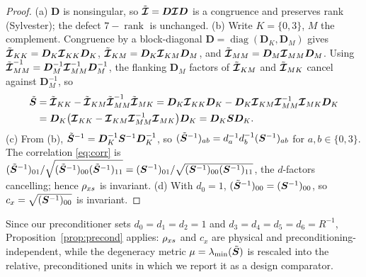 \begin{proof}
(a) $\bm{D}$ is nonsingular, so $\tilde{\bm{\mathcal{I}}}=\bm{D}\bm{\mathcal{I}}\bm{D}$ is a congruence
and preserves rank (Sylvester); the defect $7-\operatorname{rank}$ is unchanged.
(b) Write $K=\{0,3\}$, $M$ the complement. Congruence by a block-diagonal
$\bm{D}=\operatorname{diag}(\bm{D}_K,\bm{D}_M)$ gives
$\tilde{\bm{\mathcal{I}}}_{KK}=\bm{D}_K\bm{\mathcal{I}}_{KK}\bm{D}_K$,
$\tilde{\bm{\mathcal{I}}}_{KM}=\bm{D}_K\bm{\mathcal{I}}_{KM}\bm{D}_M$, and
$\tilde{\bm{\mathcal{I}}}_{MM}=\bm{D}_M\bm{\mathcal{I}}_{MM}\bm{D}_M$. Using
$\tilde{\bm{\mathcal{I}}}_{MM}^{-1}=\bm{D}_M^{-1}\bm{\mathcal{I}}_{MM}^{-1}\bm{D}_M^{-1}$, the flanking
$\bm{D}_M$ factors of $\tilde{\bm{\mathcal{I}}}_{KM}$ and $\tilde{\bm{\mathcal{I}}}_{MK}$ cancel against
$\bm{D}_M^{-1}$, so
\begin{align*}
  \tilde{\bm{S}}
  &= \tilde{\bm{\mathcal{I}}}_{KK}-\tilde{\bm{\mathcal{I}}}_{KM}\tilde{\bm{\mathcal{I}}}_{MM}^{-1}\tilde{\bm{\mathcal{I}}}_{MK}
   = \bm{D}_K\bm{\mathcal{I}}_{KK}\bm{D}_K
     - \bm{D}_K\bm{\mathcal{I}}_{KM}\bm{\mathcal{I}}_{MM}^{-1}\bm{\mathcal{I}}_{MK}\bm{D}_K\\
  &= \bm{D}_K\bigl(\bm{\mathcal{I}}_{KK}-\bm{\mathcal{I}}_{KM}\bm{\mathcal{I}}_{MM}^{-1}\bm{\mathcal{I}}_{MK}\bigr)\bm{D}_K
   = \bm{D}_K\bm{S}\bm{D}_K .
\end{align*}
(c) From (b),
$\tilde{\bm{S}}^{-1}=\bm{D}_K^{-1}\bm{S}^{-1}\bm{D}_K^{-1}$, so
$(\tilde{\bm{S}}^{-1})_{ab}=d_a^{-1}d_b^{-1}(\bm{S}^{-1})_{ab}$ for $a,b\in\{0,3\}$.
The correlation \eqref{eq:corr} is
$(\tilde{\bm{S}}^{-1})_{01}/\sqrt{(\tilde{\bm{S}}^{-1})_{00}(\tilde{\bm{S}}^{-1})_{11}}
=(\bm{S}^{-1})_{01}/\sqrt{(\bm{S}^{-1})_{00}(\bm{S}^{-1})_{11}}$, the $d$-factors
cancelling; hence $\rho_{x s}$ is invariant. (d) With $d_0=1$,
$(\tilde{\bm{S}}^{-1})_{00}=(\bm{S}^{-1})_{00}$, so
$c_x=\sqrt{(\bm{S}^{-1})_{00}}$ is invariant.
\end{proof}

\noindent Since our preconditioner sets $d_0=d_1=d_2=1$ and
$d_3=d_4=d_5=d_6=R^{-1}$, Proposition~\ref{prop:precond} applies:
$\rho_{x s}$ and $c_x$ are physical and preconditioning-independent, while the
degeneracy metric $\mu=\lambda_{\min}(\tilde{\bm{S}})$ is rescaled into the relative,
preconditioned units in which we report it as a design comparator.
